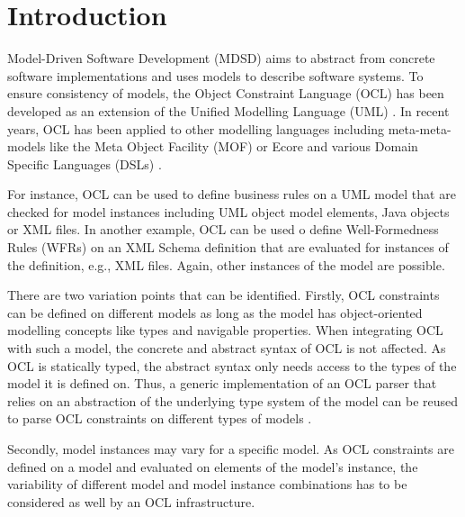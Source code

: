 \section{Introduction}

	Model-Driven Software Development (MDSD) aims to abstract from concrete 
	software implementations and uses models to describe 
	software systems. To ensure consistency of models, the Object Constraint Language 
	(OCL) \cite{spec:OCL2-2} has been developed as an extension of the Unified 
	Modelling Language (UML) \cite{spec:UML2-2}. In recent years, OCL has been 
	applied to other modelling languages including meta-meta-models 
	like the Meta Object Facility (MOF) or Ecore and various 
	Domain Specific Languages (DSLs) \cite{oclExample:DSL}. 

	For instance, OCL can be used to define business rules on a UML model 
	that are checked for model instances including UML object model elements,  
	Java objects or XML files. In another example, OCL can be used o define Well-Formedness 
	Rules (WFRs) on an XML Schema definition that are evaluated for instances 
	of the definition, e.g., XML files. Again, other instances of the model are possible.
	
	There are two variation points that can be identified. Firstly, OCL constraints can 
	be defined on different models as long as the model has object-oriented 
	modelling concepts like types and navigable properties. When integrating OCL with 
	such a model, the concrete and abstract syntax of OCL is not affected. 
	As OCL is statically typed, the abstract syntax only needs access to the types of the 
	model it is defined on. Thus, a generic implementation of an OCL parser
	that relies on an abstraction of the underlying type system of the model can be
	reused to parse OCL constraints on different types of models \cite{braeuerOCL07}.

	Secondly, model instances may vary for a specific model. As OCL constraints 
	are defined on a model and evaluated on elements of the model's instance, the variability 
	of different model and model instance combinations has to be considered as well 
	by an OCL infrastructure.
	

